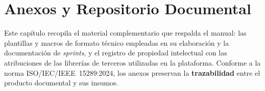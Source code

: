 \chapter{Anexos y Repositorio Documental}
\label{ch:anexos}

Este capítulo recopila el material complementario que respalda el manual: las plantillas y
macros de formato técnico empleadas en su elaboración y la documentación de \textit{sprints},
y el registro de propiedad intelectual con las atribuciones de las librerías de terceros
utilizadas en la plataforma. Conforme a la norma ISO/IEC/IEEE~15289:2024, los anexos
preservan la \textbf{trazabilidad} entre el producto documental y sus insumos.

